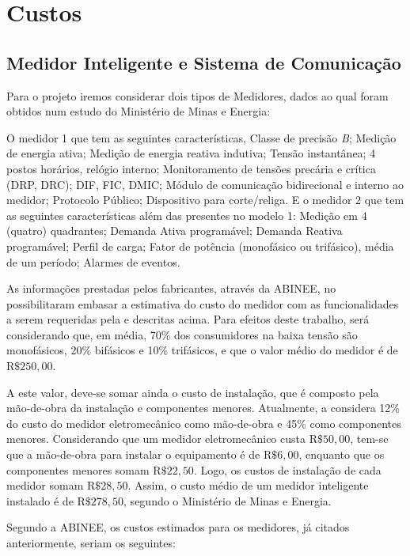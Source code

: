 \section{Custos}

\subsection{Medidor Inteligente e Sistema de Comunicação}

	Para o projeto iremos considerar dois tipos de Medidores, dados ao qual foram obtidos num estudo do Ministério de Minas e Energia:

	O medidor 1 que tem as seguintes características, Classe de precisão \textit{B}; Medição de energia ativa; Medição de energia reativa indutiva; Tensão instantânea; 4 postos horários, relógio interno; Monitoramento de tensões precária e crítica (DRP, DRC); DIF, FIC, DMIC; Módulo de comunicação bidirecional e interno ao medidor; Protocolo Público; Dispositivo para corte/religa. E o medidor 2 que tem as seguintes características além das presentes no modelo 1: Medição em 4 (quatro) quadrantes; Demanda Ativa programável; Demanda Reativa programável; Perfil de carga; Fator de potência (monofásico ou trifásico), média de um período; Alarmes de eventos.

	As informações prestadas pelos fabricantes, através da ABINEE, no possibilitaram embasar a estimativa do custo do medidor com as funcionalidades a serem requeridas pela \cite{2013Aneel} e descritas acima. Para efeitos deste trabalho, será considerando que, em média, 70\% dos consumidores na baixa tensão são monofásicos, 20\% bifásicos e 10\% trifásicos, e que o valor médio do medidor é de R$\$ 250,00$.

	A este valor, deve-se somar ainda o custo de instalação, que é composto pela mão-de-obra da instalação e componentes menores. Atualmente, a \cite{2013Aneel} considera 12\% do custo do medidor eletromecânico como mão-de-obra e 45\% como componentes menores. Considerando que um medidor eletromecânico custa R$\$ 50,00$, tem-se que a mão-de-obra para instalar o equipamento é de R$\$ 6,00$, enquanto que os componentes menores somam R$\$ 22,50$. Logo, os custos de instalação de cada medidor somam R$\$ 28,50$. Assim, o custo médio de um medidor inteligente instalado é de R$\$ 278,50$, segundo o Ministério de Minas e Energia.

	Segundo a ABINEE, os custos estimados para os medidores, já citados anteriormente, seriam os seguintes:

